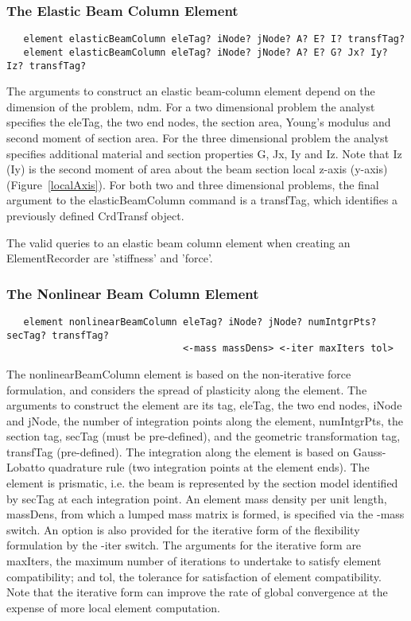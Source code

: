 \documentclass[12pt]{article}
\begin{document}
\subsubsection{The Elastic Beam Column Element}
{\sf\small
\begin{verbatim}
   element elasticBeamColumn eleTag? iNode? jNode? A? E? I? transfTag?
   element elasticBeamColumn eleTag? iNode? jNode? A? E? G? Jx? Iy? Iz? transfTag?
\end{verbatim}
}

\noindent The arguments to construct an elastic beam-column element depend on
the dimension of the problem, ndm. For a two dimensional problem the
analyst specifies the eleTag, the two end nodes, the section area,
Young's modulus and second moment of section area. For the three dimensional
problem the analyst specifies additional material and
section properties G, Jx, Iy and Iz. Note that Iz (Iy) is the second
moment of area about the beam section local z-axis (y-axis)
(Figure~\ref{localAxis}). For both two and three dimensional problems,
the final argument to the elasticBeamColumn command is a transfTag,
which identifies a previously defined CrdTransf object. 

The valid queries to an elastic beam column element when creating an
ElementRecorder are 'stiffness' and 'force'.

\subsubsection{The Nonlinear Beam Column Element}
{\sf\small
\begin{verbatim}
   element nonlinearBeamColumn eleTag? iNode? jNode? numIntgrPts? secTag? transfTag?
                               <-mass massDens> <-iter maxIters tol> 
\end{verbatim}
}

\noindent The nonlinearBeamColumn element is based on the
non-iterative force formulation, and considers the spread of
plasticity along the element. The arguments to construct the element
are its tag, eleTag, the two end nodes, iNode and jNode, the number of
integration points along the element, numIntgrPts, the section tag,
secTag (must be pre-defined), and the geometric transformation tag,
transfTag (pre-defined). The integration along the element is based on
Gauss-Lobatto quadrature rule (two integration points at the element
ends). The element is prismatic, i.e. the beam is represented by the
section  model identified by secTag at each integration point. An
element mass density per unit length, massDens, from which a lumped
mass matrix is formed, is specified via the -mass switch. An option is
also provided for the iterative form of the flexibility formulation by
the -iter switch. The arguments for the iterative form are maxIters,
the maximum number of iterations to undertake to satisfy element
compatibility; and tol, the tolerance for satisfaction of element
compatibility. Note that the iterative form can improve the rate of
global convergence at the expense of more local element computation. 
\end{document}
